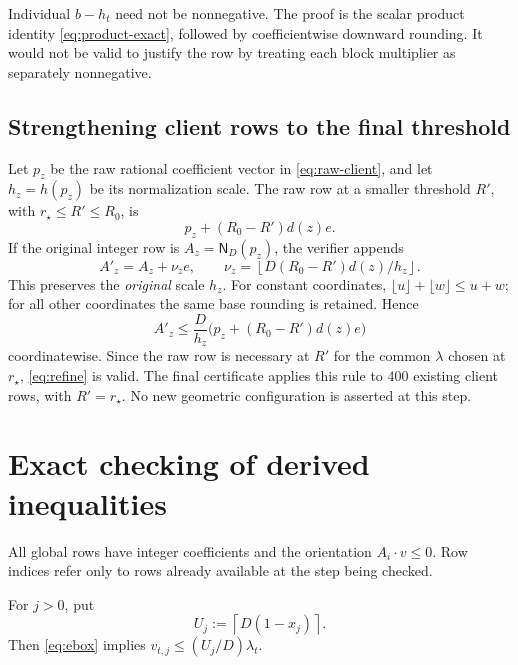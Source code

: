 \documentclass[11pt]{article}
\numberwithin{equation}{section}
\theoremstyle{definition}
\newcommand{\rstar}{r_\star}
\newcommand{\Rzero}{R_0}
\newcommand{\fl}[1]{\left\lfloor#1\right\rfloor}
\newcommand{\ce}[1]{\left\lceil#1\right\rceil}
\newcommand{\normrow}{\mathsf N_D}
\begin{document}
Individual $b-h_t$ need not be nonnegative. The proof is the scalar product
identity \eqref{eq:product-exact}, followed by coefficientwise downward
rounding. It would not be valid to justify the row by treating each block
multiplier as separately nonnegative.

\subsection{Strengthening client rows to the final threshold}
Let $p_z$ be the raw rational coefficient vector in
\eqref{eq:raw-client}, and let $h_z=h(p_z)$ be its normalization scale.
The raw row at a smaller threshold $R'$, with
$\rstar\le R'\le\Rzero$, is
\[
 p_z+(\Rzero-R')d(z)e.
\]
If the original integer row is $A_z=\normrow(p_z)$, the verifier appends
\begin{equation}\label{eq:refine}
 A'_z=A_z+\nu_ze,
 \qquad
 \nu_z=\fl{D(\Rzero-R')d(z)/h_z}.
\end{equation}
This preserves the \emph{original} scale $h_z$.
For constant coordinates, $\lfloor u\rfloor+\lfloor w\rfloor\le u+w$;
for all other coordinates the same base rounding is retained. Hence
\[
 A'_z\le \frac D{h_z}
       \bigl(p_z+(\Rzero-R')d(z)e\bigr)
\]
coordinatewise. Since the raw row is necessary at $R'$ for the common
$\lambda$ chosen at $\rstar$, \eqref{eq:refine} is valid.
The final certificate applies this rule to $400$ existing client rows, with
$R'=\rstar$. No new geometric configuration is asserted at this step.

\section{Exact checking of derived inequalities}\label{sec:arithmetic}

All global rows have integer coefficients and the orientation
$A_i\cdot v\le0$. Row indices refer only to rows already available at the
step being checked.

For $j>0$, put
\begin{equation}\label{eq:Uj}
 U_j:=\ce{D(1-x_j)}.
\end{equation}
Then \eqref{eq:ebox} implies
$v_{t,j}\le(U_j/D)\lambda_t$.
\end{document}
